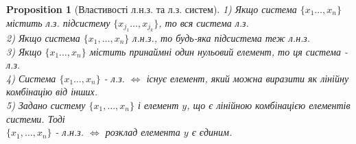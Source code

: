 \documentclass[a4paper, 10pt]{article}
\theoremstyle{theoremdd}
\theoremstyle{theoremdd}
\theoremstyle{theoremdd}
\theoremstyle{theoremdd}
\theoremstyle{theoremdd}
\newtheorem{proposition}[theorem]{Proposition}
\theoremstyle{theoremdd}
\theoremstyle{theoremdd}
\theoremstyle{theoremdd}
\begin{document}
	\begin{proposition}[Властивості л.н.з. та л.з. систем]
	1) Якщо система $\{x_1 \dots, x_n\}$ містить л.з. підсистему $\{x_{j_1} \dots, x_{j_k}\}$, то вся система л.з.\\
	2) Якщо система $\{x_1, \dots, x_n\}$ л.н.з., то будь-яка підсистема теж л.н.з.\\
	3) Якщо $\{x_1 \dots, x_n\}$ містить принаймні один нульовий елемент, то ця система - л.з.\\
	4) Система $\{x_1 \dots, x_n\}$ - л.з. $\iff$ існує елемент, який можна виразити як лінійну комбінацію від інших.\\
	5) Задано систему $\{x_1, \dots, x_n\}$ і елемент $y$, що є лінійною комбінацією елементів системи. Тоді\\
		$\{x_1, \dots, x_n\}$ - л.н.з. $\iff$ розклад елемента $y$ є єдиним.
	\end{proposition}
	
\end{document}
